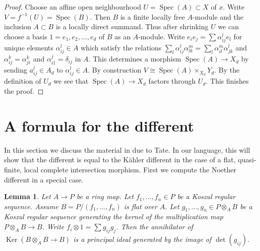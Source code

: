 \documentclass{stacks-project}
\newenvironment{reference}{\comment}{\endcomment}
\theoremstyle{plain}
\newtheorem{lemma}[subsection]{Lemma}
\theoremstyle{definition}
\theoremstyle{remark}
\numberwithin{equation}{subsection}
\def\Spec{\mathop{\mathrm{Spec}}}
\def\Ker{\mathop{\mathrm{Ker}}}
\begin{document}
\begin{proof}
Choose an affine open neighbourhood $U = \Spec(A) \subset X$ of $x$.
Write $V = f^{-1}(U) = \Spec(B)$. Then $B$ is a finite locally free
$A$-module and the inclusion $A \subset B$ is a locally direct summand.
Thus after shrinking $U$ we can choose a basis $1 = e_1, e_2, \ldots, e_d$
of $B$ as an $A$-module. Write
$e_i e_j = \sum \alpha_{ij}^l e_l$ for unique
elements $\alpha_{ij}^l \in A$ which satisfy the relations
$\sum_l \alpha_{ij}^l \alpha_{lk}^m = \sum_l \alpha_{il}^m \alpha _{jk}^l$
and $\alpha_{ij}^k = \alpha_{ji}^k$ and $\alpha_{i1}^j = \delta_{ij}$
in $A$. This determines a morphism $\Spec(A) \to X_d$ by sending
$a_{ij}^l \in A_d$ to $\alpha_{ij}^l \in A$. By construction
$V \cong \Spec(A) \times_{X_d} Y_d$. By the definition of $U_d$
we see that $\Spec(A) \to X_d$ factors through $U_d$. This
finishes the proof.
\end{proof}










\section{A formula for the different}
\label{section-formula-different}

\noindent
In this section we discuss the material in \cite[Appendix A]{Mazur-Roberts}
due to Tate. In our language, this will show that the different is
equal to the K\"ahler different in the case of a flat, quasi-finite,
local complete intersection morphism.
First we compute the Noether different in a special case.

\begin{lemma}
\label{lemma-tate}
\begin{reference}
\cite[Appendix]{Mazur-Roberts}
\end{reference}
Let $A \to P$ be a ring map. Let $f_1, \ldots, f_n \in P$ be a
Koszul regular sequence. Assume $B = P/(f_1, \ldots, f_n)$
is flat over $A$. Let $g_1, \ldots, g_n \in P \otimes_A B$
be a Koszul regular sequence generating the kernel of the multiplication
map $P \otimes_A B \to B$. Write $f_i \otimes 1 = \sum g_{ij} g_j$.
Then the annihilator of $\Ker(B \otimes_A B \to B)$ is a principal
ideal generated by the image of $\det(g_{ij})$.
\end{lemma}
\end{document}
